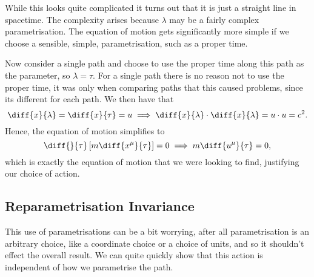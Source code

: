 \documentclass[fleqn]{NotesClass}
\begin{document}
    While this looks quite complicated it turns out that it is just a straight line in spacetime.
    The complexity arises because \(\lambda\) may be a fairly complex parametrisation.
    The equation of motion gets significantly more simple if we choose a sensible, simple, parametrisation, such as a proper time.
    
    Now consider a single path and choose to use the proper time along this path as the parameter, so \(\lambda = \tau\).
    For a single path there is no reason not to use the proper time, it was only when comparing paths that this caused problems, since its different for each path.
    We then have that
    \begin{equation}
        \diff{x}{\lambda} = \diff{x}{\tau} = u \implies \diff{x}{\lambda}\cdot\diff{x}{\lambda} = u \cdot u = c^2.
    \end{equation}
    Hence, the equation of motion simplifies to
    \begin{equation}
        \diff{}{\tau}\left[ m\diff{x^\mu}{\tau} \right] = 0 \implies m\diff{u^\mu}{\tau} = 0,
    \end{equation}
    which is exactly the equation of motion that we were looking to find, justifying our choice of action.
    
    \subsection{Reparametrisation Invariance}
    This use of parametrisations can be a bit worrying, after all parametrisation is an arbitrary choice, like a coordinate choice or a choice of units, and so it shouldn't effect the overall result.
    We can quite quickly show that this action is independent of how we parametrise the path.
    
\end{document}
